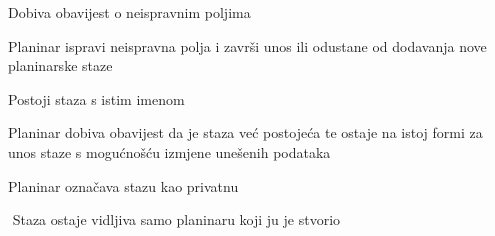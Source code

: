\begin{packed_item}
\begin{packed_item}
\begin{packed_enum}
						\item $ $Dobiva obavijest o neispravnim poljima$ $
						\item $ $Planinar ispravi neispravna polja i završi unos ili odustane od dodavanja nove planinarske staze$ $
					\end{packed_enum}
					\item[4.a] $ $Postoji staza s istim imenom$ $
					\item[] \begin{packed_enum}
						\item $ $Planinar dobiva obavijest da je staza već postojeća te ostaje na istoj formi za unos staze s mogućnošću izmjene unešenih podataka$ $
					\end{packed_enum}
					\item[5.a] $ $Planinar označava stazu kao privatnu$ $
					\item[] \begin{packed_enum}
						\item $ $ Staza ostaje vidljiva samo planinaru koji ju je stvorio $ $
					\end{packed_enum}
				\end{packed_item}
			\end{packed_item}
			
